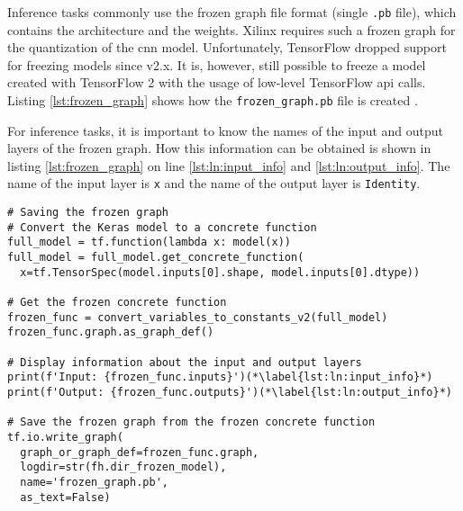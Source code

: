 Inference tasks commonly use the frozen graph file format (single \texttt{.pb} file), which contains the architecture and the weights.
Xilinx requires such a frozen graph for the quantization of the \acrshort{cnn} model.
Unfortunately, TensorFlow dropped support for freezing models since v2.x.
It is, however, still possible to freeze a model created with TensorFlow 2 with the usage of low-level TensorFlow \acrshort{api} calls.
Listing \ref{lst:frozen_graph} shows how the \texttt{frozen\_graph.pb} file is created \cite{training_train_frozen}.

For inference tasks, it is important to know the names of the input and output layers of the frozen graph.
How this information can be obtained is shown in listing \ref{lst:frozen_graph} on line \ref{lst:ln:input_info} and \ref{lst:ln:output_info}.
The name of the input layer is \texttt{x} and the name of the output layer is \texttt{Identity}.

\clearpage

\begin{lstlisting}[style=python, caption={Saving the model in the frozen graph file format \cite{training_train_frozen}}, label=lst:frozen_graph]
# Saving the frozen graph
# Convert the Keras model to a concrete function
full_model = tf.function(lambda x: model(x))
full_model = full_model.get_concrete_function(
  x=tf.TensorSpec(model.inputs[0].shape, model.inputs[0].dtype))

# Get the frozen concrete function
frozen_func = convert_variables_to_constants_v2(full_model)
frozen_func.graph.as_graph_def()

# Display information about the input and output layers
print(f'Input: {frozen_func.inputs}')(*\label{lst:ln:input_info}*)
print(f'Output: {frozen_func.outputs}')(*\label{lst:ln:output_info}*)

# Save the frozen graph from the frozen concrete function
tf.io.write_graph(
  graph_or_graph_def=frozen_func.graph,
  logdir=str(fh.dir_frozen_model),
  name='frozen_graph.pb',
  as_text=False)
\end{lstlisting}
